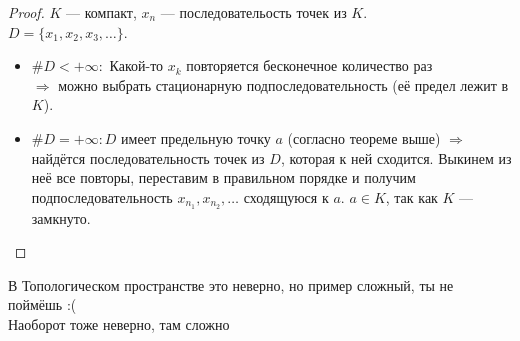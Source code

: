 \begin{proof}
    $K$ --- компакт, $x_n$ --- последовательость точек из $K$. \\
    $D = \{x_1,x_2,x_3,\dots \}$.

    \begin{itemize}
        \item[] $\#D < +\infty:$ Какой-то $x_k$ повторяется бесконечное количество раз \\
        $\Longrightarrow$ можно выбрать стационарную подпоследовательность (её предел лежит в $K$).
        \item[] $\#D = +\infty: D$ имеет предельную точку $a$ (согласно теореме выше) $\Longrightarrow$ найдётся последовательность точек
        из $D$, которая к ней сходится. Выкинем из неё все повторы, переставим в правильном порядке и получим
        подпоследовательность $x_{n_1}, x_{n_2},\dots $ сходящуюся к $a$. $a \in K$, так как $K$ --- замкнуто.
    \end{itemize}

\end{proof}
    
\notice \quad В Топологическом пространстве это неверно, но пример сложный, ты не поймёшь :( \\
Наоборот тоже неверно, там сложно
